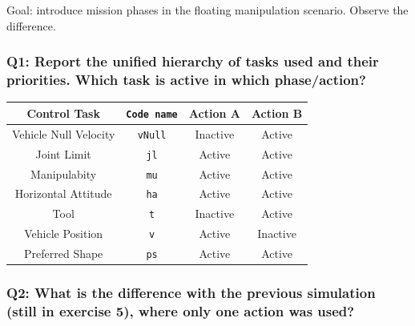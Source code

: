 \documentclass{article}
\begin{document}
Goal: introduce mission phases in the floating manipulation scenario. Observe the difference.

\subsubsection{Q1: Report the unified hierarchy of tasks used and their priorities. Which task is active in which phase/action?}

\begin{center}
\begin{tabular}{ | c | c | c | c |}
\hline
 Control Task & \texttt{Code name} & Action A & Action B \\
 \hline
 Vehicle Null Velocity & \texttt{vNull} & Inactive & Active \\
 Joint Limit & \texttt{jl} & Active & Active \\
 Manipulabity &  \texttt{mu} & Active & Active\\
 Horizontal Attitude &  \texttt{ha} & Active & Active \\
 Tool  &  \texttt{t} & Inactive & Active\\
 Vehicle Position &  \texttt{v} &Active & Inactive\\
 Preferred Shape & \texttt{ps} & Active & Active\\
 \hline
\end{tabular}
\end{center}

\subsubsection{Q2: What is the difference with the previous simulation (still in exercise 5), where only one action was used?}
\end{document}
